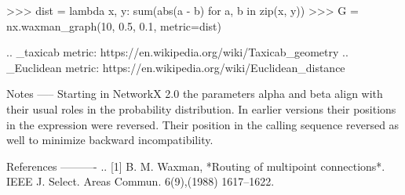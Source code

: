 \begin{DoxyVerb}
    >>> dist = lambda x, y: sum(abs(a - b) for a, b in zip(x, y))
    >>> G = nx.waxman_graph(10, 0.5, 0.1, metric=dist)

.. _taxicab metric: https://en.wikipedia.org/wiki/Taxicab_geometry
.. _Euclidean metric: https://en.wikipedia.org/wiki/Euclidean_distance

Notes
-----
Starting in NetworkX 2.0 the parameters alpha and beta align with their
usual roles in the probability distribution. In earlier versions their
positions in the expression were reversed. Their position in the calling
sequence reversed as well to minimize backward incompatibility.

References
----------
.. [1]  B. M. Waxman, *Routing of multipoint connections*.
   IEEE J. Select. Areas Commun. 6(9),(1988) 1617--1622.
\end{DoxyVerb}
 